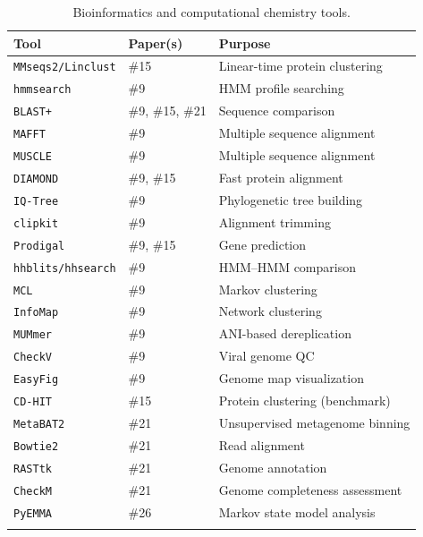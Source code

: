 \documentclass[11pt,letterpaper]{article}
\newcommand{\tool}[1]{\texttt{#1}}
\begin{document}
\begin{longtable}{l l p{6.5cm}}
\toprule
\textbf{Tool} & \textbf{Paper(s)} & \textbf{Purpose} \\
\midrule
\tool{MMseqs2/Linclust} & \#15       & Linear-time protein clustering \\
\tool{hmmsearch}     & \#9             & HMM profile searching \\
\tool{BLAST+}        & \#9, \#15, \#21 & Sequence comparison \\
\tool{MAFFT}         & \#9             & Multiple sequence alignment \\
\tool{MUSCLE}        & \#9             & Multiple sequence alignment \\
\tool{DIAMOND}       & \#9, \#15       & Fast protein alignment \\
\tool{IQ-Tree}       & \#9             & Phylogenetic tree building \\
\tool{clipkit}       & \#9             & Alignment trimming \\
\tool{Prodigal}      & \#9, \#15       & Gene prediction \\
\tool{hhblits/hhsearch} & \#9          & HMM--HMM comparison \\
\tool{MCL}           & \#9             & Markov clustering \\
\tool{InfoMap}       & \#9             & Network clustering \\
\tool{MUMmer}        & \#9             & ANI-based dereplication \\
\tool{CheckV}        & \#9             & Viral genome QC \\
\tool{EasyFig}       & \#9             & Genome map visualization \\
\tool{CD-HIT}        & \#15            & Protein clustering (benchmark) \\
\tool{MetaBAT2}      & \#21            & Unsupervised metagenome binning \\
\tool{Bowtie2}       & \#21            & Read alignment \\
\tool{RASTtk}        & \#21            & Genome annotation \\
\tool{CheckM}        & \#21            & Genome completeness assessment \\
\tool{PyEMMA}        & \#26            & Markov state model analysis \\
\bottomrule
\caption{Bioinformatics and computational chemistry tools.}
\end{longtable}
\end{document}
